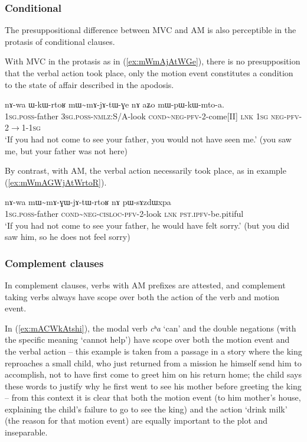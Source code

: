 \documentclass[oneside,a4paper,11pt]{article}
\newcommand{\japhug}[2]{\textit{\phon#1} `#2'}
\newcommand{\redp}{\textasciitilde}
\newcommand{\fl}{$\rightarrow$}
\begin{document}
\subsubsection{Conditional} \label{sec:am.conditional}
The presuppositional difference between MVC and AM is also perceptible in the protasis of conditional clauses. 

With MVC in the protasis as in (\ref{ex:mWmAjAtWGe}), there is no presupposition that the verbal action took place, only the motion event constitutes a condition to the state of affair described in the apodosis.

\begin{exe}
\ex \label{ex:mWmAjAtWGe}
\gll nɤ-wa ɯ-kɯ-rtoʁ mɯ\redp{}mɤ-jɤ-tɯ-ɣe nɤ aʑo mɯ-pɯ-kɯ-mto-a. \\
\textsc{1sg.poss}-father \textsc{3sg.poss-}\textsc{nmlz}:S/A-look \textsc{cond}\redp{}\textsc{neg}-\textsc{pfv}-2-come[II] \textsc{lnk} \textsc{1sg} \textsc{neg}-\textsc{pfv}-2\fl{}1-\textsc{1sg} \\
\glt `If you had not come to see your father, you would not have seen me.' (you saw me, but your father was not here)
\end{exe}

By contrast, with AM, the verbal action necessarily took place, as in example (\ref{ex:mWmAGWjAtWrtoR}).

\begin{exe}
\ex \label{ex:mWmAGWjAtWrtoR}
\gll nɤ-wa  mɯ\redp{}mɤ-ɣɯ-jɤ-tɯ-rtoʁ nɤ pɯ-sɤzdɯxpa \\
\textsc{1sg.poss}-father \textsc{cond}\redp{}\textsc{neg}-\textsc{cisloc}-\textsc{pfv}-2-look \textsc{lnk} \textsc{pst.ipfv}-be.pitiful \\ 
\glt `If you had not come to see your father, he would have felt sorry.' (but you did saw him, so he does not feel sorry)
\end{exe}

\subsubsection{Complement clauses} \label{sec:am.conditional}
In complement clauses, verbs with AM prefixes are attested, and complement taking verbs always have scope over both the action of the verb and motion event.

 
In (\ref{ex:mACWkAtshi}), the modal verb \japhug{cʰa}{can} and the double negations (with the specific meaning `cannot help') have scope over both the motion event and the verbal action -- this example is taken from a passage in a story where the king reproaches a small child, who just returned from a mission he himself send him to accomplish, not to have first come to greet him on his return home; the child says these words to justify why he first went to see his mother before greeting the king -- from this context it is clear that both the motion event (to him mother's house, explaining the child's failure to go to see the king) and the action `drink milk' (the reason for that motion event) are equally important to the plot and inseparable. 
\end{document}
